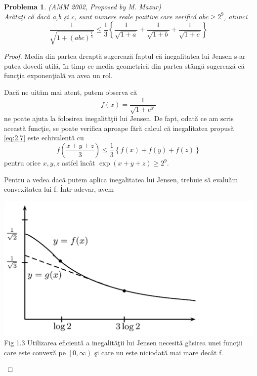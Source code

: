 \documentclass[a4paper,12pt,oneside]{report}
\newtheorem{problem}{Problema}
\begin{document}
\begin{problem}(AMM 2002, Proposed by M. Mazur)\\
Ar\u{a}ta\c{t}i c\u{a} dac\u{a} a,b \c{s}i c, sunt numere reale pozitive care verific\u{a} \(abc \geq 2^{9}\), atunci
\begin{displaymath}
  \frac{1}{\sqrt{1 + \left ( abc \right )^{\frac{1}{3}}}}\leq \frac{1}{3}\left \{ \frac{1}{\sqrt{1 + a}} + \frac{1}{\sqrt{1 + b}} + \frac{1}{\sqrt{1 + c}}\right \}     
  \label{eq:2.7} \tag{2.7}
\end{displaymath}
\end{problem}
\begin{proof}
Media din partea dreapt\u{a} sugereaz\u{a} faptul c\u{a} inegalitatea lui Jensen s-ar putea dovedi util\u{a}, \^{i}n timp ce media geometric\u{a} din partea st\^{a}ng\u{a} sugereaz\u{a} c\u{a} func\c{t}ia exponen\c{t}ial\u{a} va avea un rol.

Dac\u{a} ne uit\u{a}m mai atent, putem observa c\u{a}
\begin{displaymath}
  f\left ( x \right ) = \frac{1}{\sqrt{1+ e^{x}}}
\end{displaymath}
ne poate ajuta la folosirea inegalit\u{a}\c{t}ii lui Jensen. De fapt, odat\u{a} ce am scris aceast\u{a} func\c{t}ie, se poate verifica aproape f\u{a}r\u{a} calcul c\u{a} inegalitatea propus\u{a} \ref{eq:2.7} este echivalent\u{a} cu
\begin{displaymath}
  f\left ( \frac{x + y + z}{3} \right )\leq \frac{1}{3}\left \{ f\left ( x \right ) + f\left ( y \right ) + f\left ( z \right ) \right \}    \label{eq:2.8} \tag{2.8}
\end{displaymath}
pentru orice $x, y, z$ astfel \^{i}nc\^{a}t \(\exp\left ( x + y + z \right )\geq 2^{9}.\)

Pentru a vedea dac\u{a} putem aplica inegalitatea lui Jensen, trebuie s\u{a} evalu\u{a}m convexitatea lui f. \^{I}ntr-adevar, avem

\begin{center}
  \includegraphics[width=1.0\textwidth]{fig_pb3.png}
  \\ Fig 1.3 Utilizarea eficient\u{a} a inegalit\u{a}\c{t}ii lui Jensen necesit\u{a} g\u{a}sirea unei func\c{t}ii care este convex\u{a} pe \(\left [ 0, \infty  \right )\)  \c{s}i care nu este niciodat\u{a} mai mare dec\^{a}t f.
\end{center}


\end{proof}
\end{document}
